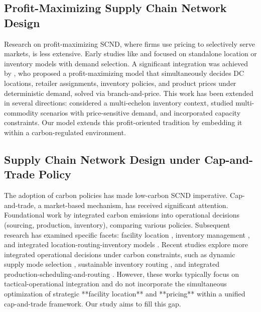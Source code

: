 \documentclass[]{article}
\theoremstyle{plain}%
\theoremstyle{definition}
\theoremstyle{remark}
\theoremstyle{plain}%
\begin{document}
\subsection{Profit-Maximizing Supply Chain Network Design}
Research on profit-maximizing SCND, where firms use pricing to selectively serve markets, is less extensive. Early studies like \cite{zhang2001profit} and \cite{geunes2004economic} focused on standalone location or inventory models with demand selection. A significant integration was achieved by \cite{shen2006profit}, who proposed a profit-maximizing model that simultaneously decides DC locations, retailer assignments, inventory policies, and product prices under deterministic demand, solved via branch-and-price. This work has been extended in several directions: \cite{shu2012logistics} considered a multi-echelon inventory context, \cite{ahmadi2015incorporating} studied multi-commodity scenarios with price-sensitive demand, and \cite{li2019capacitated} incorporated capacity constraints. Our model extends this profit-oriented tradition by embedding it within a carbon-regulated environment.

\subsection{Supply Chain Network Design under Cap-and-Trade Policy}
The adoption of carbon policies has made low-carbon SCND imperative. Cap-and-trade, a market-based mechanism, has received significant attention. Foundational work by \cite{benjaafar2013carbon} integrated carbon emissions into operational decisions (sourcing, production, inventory), comparing various policies. Subsequent research has examined specific facets: facility location \cite{diabat2013strategic,zhang2021location}, inventory management \cite{hua2011managing, chen2013carbon, shu2017manufacturers}, and integrated location-routing-inventory models \cite{li2022carbon}. Recent studies explore more integrated operational decisions under carbon constraints, such as dynamic supply mode selection \cite{drent2023efficient}, sustainable inventory routing \cite{prakash2024enhanced}, and integrated production-scheduling-and-routing \cite{ganjia2026multi}. However, these works typically focus on tactical-operational integration and do not incorporate the simultaneous optimization of strategic **facility location** and **pricing** within a unified cap-and-trade framework. Our study aims to fill this gap.
\end{document}
